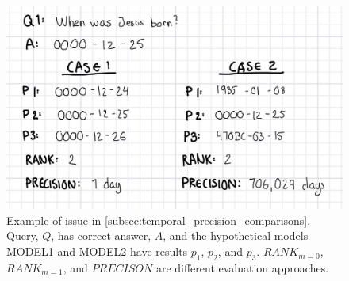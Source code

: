 \begin{figure}[htb]
\centering
\begin{minipage}{0.95\columnwidth}
\centering
\small
\includegraphics[scale=0.13]{content/preliminary_experiments/figures/temporal_precision.jpg}
\caption{Example of issue in \autoref{subsec:temporal_precision_comparisons}. Query, $Q$, has correct answer, $A$, and the hypothetical models \textsc{MODEL1} and \textsc{MODEL2} have results $p_1$, $p_2$, and $p_3$. \textsc{$RANK_{m=0}$}, \textsc{$RANK_{m=1}$}, and \textsc{$PRECISON$} are different evaluation approaches.}
\label{fig:temporal_precision}
\end{minipage}
\end{figure}